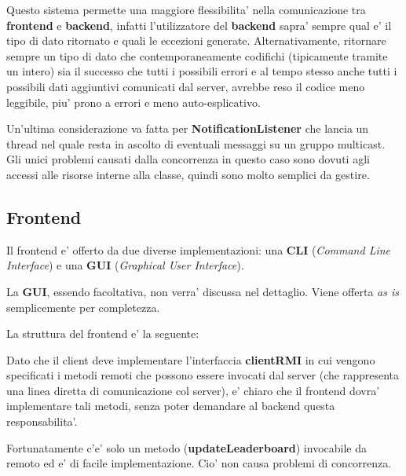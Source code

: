 Questo sistema permette una maggiore flessibilita' nella comunicazione tra \textbf{frontend} e \textbf{backend}, infatti l'utilizzatore del \textbf{backend} sapra' sempre qual e' il tipo di dato ritornato e quali le eccezioni generate. Alternativamente, ritornare sempre un tipo di dato che contemporaneamente codifichi (tipicamente tramite un intero) sia il successo che tutti i possibili errori e al tempo stesso anche tutti i possibili dati aggiuntivi comunicati dal server, avrebbe reso il codice meno leggibile, piu' prono a errori e meno auto-esplicativo.

Un'ultima considerazione va fatta per \textbf{NotificationListener} che lancia un thread nel quale resta in ascolto di eventuali messaggi su un gruppo multicast. Gli unici problemi causati dalla concorrenza in questo caso sono dovuti agli accessi alle risorse interne alla classe, quindi sono molto semplici da gestire.

\subsection{Frontend}

Il frontend e' offerto da due diverse implementazioni: una \textbf{CLI} (\emph{Command Line Interface}) e una \textbf{GUI} (\emph{Graphical User Interface}).

La \textbf{GUI}, essendo facoltativa, non verra' discussa nel dettaglio. Viene offerta \emph{as is} semplicemente per completezza.

La struttura del frontend e' la seguente:
\bigskip

\bigskip

Dato che il client deve implementare l'interfaccia \textbf{clientRMI} in cui vengono specificati i metodi remoti che possono essere invocati dal server (che rappresenta una linea diretta di comunicazione col server), e' chiaro che il frontend dovra' implementare tali metodi, senza poter demandare al backend questa responsabilita'.

Fortunatamente c'e' solo un metodo (\textbf{updateLeaderboard}) invocabile da remoto ed e' di facile implementazione. Cio' non causa problemi di concorrenza.


